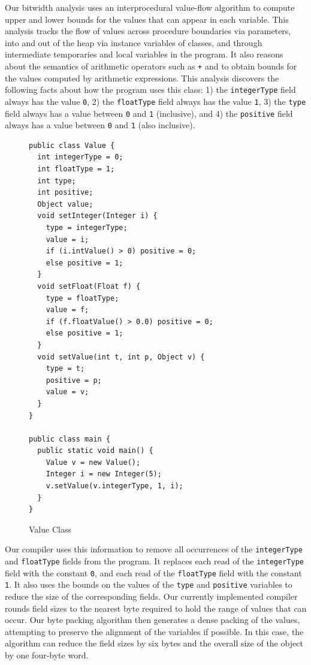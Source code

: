 \documentclass{acmconf}
\begin{document}
Our bitwidth analysis uses an interprocedural
value-flow algorithm to compute upper and lower bounds for the
values that can appear in each variable. This analysis tracks
the flow of values across procedure boundaries via parameters,
into and out of the heap via instance variables of classes, and through
intermediate temporaries and local variables in the program.
It also reasons about the semantics of arithmetic operators such
as {\tt +} and {\tt *} to obtain bounds for the values computed
by arithmetic expressions. 
This analysis discovers the following facts about 
how the program uses this class: 1) the {\tt integerType} 
field always has the value {\tt 0}, 2) the {\tt floatType} 
field always has the value {\tt 1}, 3) the {\tt type} 
field always has a value between {\tt 0} and {\tt 1} (inclusive),
and 4) the {\tt positive} field always has a value between 
{\tt 0} and {\tt 1} (also inclusive).

\begin{figure}
\begin{verbatim}
public class Value { 
  int integerType = 0;
  int floatType = 1;
  int type;
  int positive;
  Object value;
  void setInteger(Integer i) { 
    type = integerType;
    value = i;
    if (i.intValue() > 0) positive = 0;
    else positive = 1;
  }
  void setFloat(Float f) { 
    type = floatType;
    value = f;
    if (f.floatValue() > 0.0) positive = 0;
    else positive = 1;
  }
  void setValue(int t, int p, Object v) { 
    type = t;
    positive = p;
    value = v;
  }
}

public class main { 
  public static void main() { 
    Value v = new Value();
    Integer i = new Integer(5);
    v.setValue(v.integerType, 1, i);
  }
}
\end{verbatim}
\caption{\label{fig:value} Value Class}
\end{figure}

Our compiler uses this information to remove all occurrences
of the {\tt integerType} and {\tt floatType} fields from the
program. It replaces each read of the {\tt integerType} field
with the constant {\tt 0}, and each read of the {\tt floatType}
field with the constant {\tt 1}. It also uses the bounds on the 
values of the {\tt type} and {\tt positive} variables to reduce the size of the 
corresponding fields. Our currently implemented compiler rounds
field sizes to the nearest byte required to hold the range
of values that can occur. Our byte packing algorithm then 
generates a dense packing of the values, attempting to preserve
the alignment of the variables if possible. In this case, the
algorithm can reduce the field sizes by six bytes and the overall
size of the object by one four-byte word. 
\end{document}
